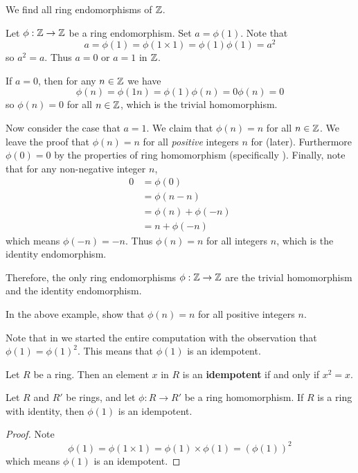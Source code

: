 \begin{example}\label{example-endomorphisms-of-Z}
    We find all ring endomorphisms of $\mathbb{Z}$.

    Let $\phi:\mathbb{Z}\to\mathbb{Z}$ be a ring endomorphism. Set $a = \phi(1)$. Note that
    \[
        a = \phi(1) = \phi(1\times1) = \phi(1)\phi(1) = a^2
    \]
    so $a^2 = a$. Thus $a = 0$ or $a = 1$ in $\mathbb{Z}$.

    If $a = 0$, then for any $n \in \mathbb{Z}$ we have
    \[
        \phi(n) = \phi(1n) = \phi(1)\phi(n) = 0\phi(n) = 0
    \]
    so $\phi(n) = 0$ for all $n \in \mathbb{Z}$, which is the trivial homomorphism.

    Now consider the case that $a = 1$. We claim that $\phi(n) = n$ for all $n \in \mathbb{Z}$. We leave the proof that $\phi(n) = n$ for all \textit{positive} integers $n$ for  (later). Furthermore $\phi(0) = 0$ by the properties of ring homomorphism (specifically ). Finally, note that for any non-negative integer $n$,
    \begin{align*}
        0 &= \phi(0)\\
        &= \phi(n - n)\\
        &= \phi(n) + \phi(-n)\\
        &= n + \phi(-n)
    \end{align*}
    which means $\phi(-n) = -n$. Thus $\phi(n) = n$ for all integers $n$, which is the identity endomorphism.

    Therefore, the only ring endomorphisms $\phi:\mathbb{Z}\to\mathbb{Z}$ are the trivial homomorphism and the identity endomorphism.
\end{example}
\begin{exercise}\label{exercise-homomorphism-maps-n-to-n-if-n-is-positive}
    In the above example, show that $\phi(n) = n$ for all positive integers $n$.
\end{exercise}
Note that in  we started the entire computation with the observation that $\phi(1) = \phi(1)^2$. This means that $\phi(1)$ is an idempotent.
\begin{definition}
    Let $R$ be a ring. Then an element $x$ in $R$ is an \textbf{idempotent} if and only if $x^2 = x$.
\end{definition}
\begin{proposition}\label{prop-homomorphism-on-multiplicative-identity-is-idempotent}
    Let $R$ and $R'$ be rings, and let $\phi: R \to R'$ be a ring homomorphism. If $R$ is a ring with identity, then $\phi(1)$ is an idempotent.
\end{proposition}
\begin{proof}
    Note
    \[
        \phi(1) = \phi(1 \times 1) = \phi(1) \times \phi(1) = \left(\phi(1)\right)^2
    \]
    which means $\phi(1)$ is an idempotent.
\end{proof}

